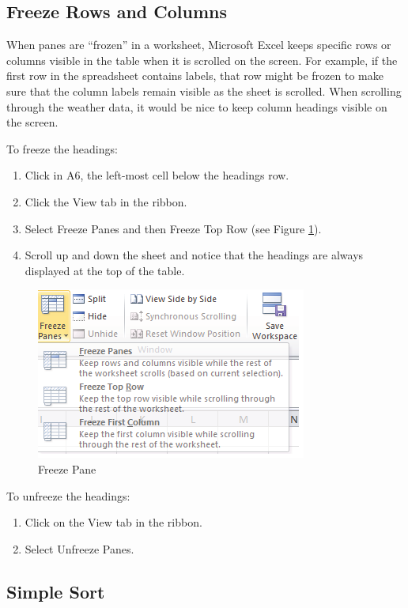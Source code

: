 \subsection{Freeze Rows and Columns}

When panes are ``frozen'' in a worksheet, Microsoft Excel keeps specific rows or columns visible in the table when it is scrolled on the screen. For example, if the first row in the spreadsheet contains labels, that row might be frozen to make sure that the column labels remain visible as the sheet is scrolled. When scrolling through the weather data, it would be nice to keep column headings visible on the screen.

To freeze the headings:

\begin{enumerate}
	\item Click in \textsf{A6}, the left-most cell below the headings row.
	\item Click the View tab in the ribbon.
	\item Select Freeze Panes and then Freeze Top Row (see Figure \ref{05:fig07}).
	\item Scroll up and down the sheet and notice that the headings are always displayed at the top of the table.
\end{enumerate}

\begin{figure}[H]
	\centering
	\includegraphics[width=\maxwidth{.95\linewidth}]{gfx/ch05_fig07}
	\caption{Freeze Pane}
	\label{05:fig07}
\end{figure}

To unfreeze the headings:

\begin{enumerate}
	\item Click on the View tab in the ribbon.
	\item Select Unfreeze Panes.
\end{enumerate}

\subsection{Simple Sort}

